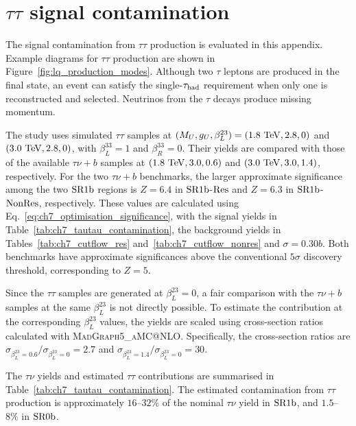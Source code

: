 \chapter{\texorpdfstring{$\tau\tau$}{tau tau} signal contamination}
\label{app:tautau_contamination}

The signal contamination from $\tau\tau$ production is evaluated in this appendix. Example diagrams for $\tau\tau$ production are shown in Figure~\ref{fig:lq_production_modes}.
Although two $\tau$ leptons are produced in the final state, an event can satisfy the single-$\tau_{\mathrm{had}}$ requirement when only one is reconstructed and selected. Neutrinos from the $\tau$ decays produce missing momentum.

\begingroup
\setlength{\emergencystretch}{2em}
The study uses simulated $\tau\tau$ samples at $(M_U,g_U,\beta_L^{23})=(1.8~\mathrm{TeV},2.8,0)$ and $(3.0~\mathrm{TeV},2.8,0)$, with $\beta_L^{33}=1$ and $\beta_R^{33}=0$. Their yields are compared with those of the available $\tau\nu+b$ samples at $(1.8~\mathrm{TeV},3.0,0.6)$ and $(3.0~\mathrm{TeV},3.0,1.4)$, respectively.
For the two $\tau\nu+b$ benchmarks, the larger approximate significance among the two $\mathrm{SR1b}$ regions is $Z=6.4$ in $\mathrm{SR1b}$-$\mathrm{Res}$ and $Z=6.3$ in $\mathrm{SR1b}$-$\mathrm{NonRes}$, respectively.
These values are calculated using Eq.~\eqref{eq:ch7_optimisation_significance}, with the signal yields in Table~\ref{tab:ch7_tautau_contamination}, the background yields in Tables~\ref{tab:ch7_cutflow_res} and~\ref{tab:ch7_cutflow_nonres} and $\sigma=0.30b$.
Both benchmarks have approximate significances above the conventional $5\sigma$ discovery threshold, corresponding to $Z=5$.
\par\endgroup

Since the $\tau\tau$ samples are generated at $\beta_L^{23}=0$, a fair comparison with the $\tau\nu+b$ samples at the same $\beta_L^{23}$ is not directly possible. To estimate the contribution at the corresponding $\beta_L^{23}$ values, the yields are scaled using cross-section ratios calculated with \textsc{MadGraph5\_aMC@NLO}. Specifically, the cross-section ratios are $\sigma_{\beta_L^{23}=0.6}/\sigma_{\beta_L^{23}=0}=2.7$ and $\sigma_{\beta_L^{23}=1.4}/\sigma_{\beta_L^{23}=0}=30$.

The $\tau\nu$ yields and estimated $\tau\tau$ contributions are summarised in Table~\ref{tab:ch7_tautau_contamination}.
The estimated contamination from $\tau\tau$ production is approximately $16$--$32\%$ of the nominal $\tau\nu$ yield in $\mathrm{SR1b}$, and $1.5$--$8\%$ in $\mathrm{SR0b}$.

